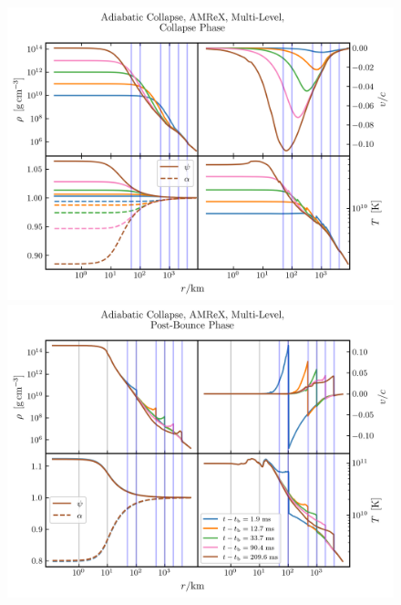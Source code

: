 \documentclass{beamer}
\begin{document}
\begin{frame}

  \begin{figure}[htb!]
    \centering
    \begin{minipage}{0.49\textwidth}
      \includegraphics[width=\textwidth]{fig.Collapse.png}
    \end{minipage}
    \begin{minipage}{0.49\textwidth}
      \includegraphics[width=\textwidth]{fig.PostBounce.png}
    \end{minipage}
  \end{figure}

\end{frame}
\end{document}
